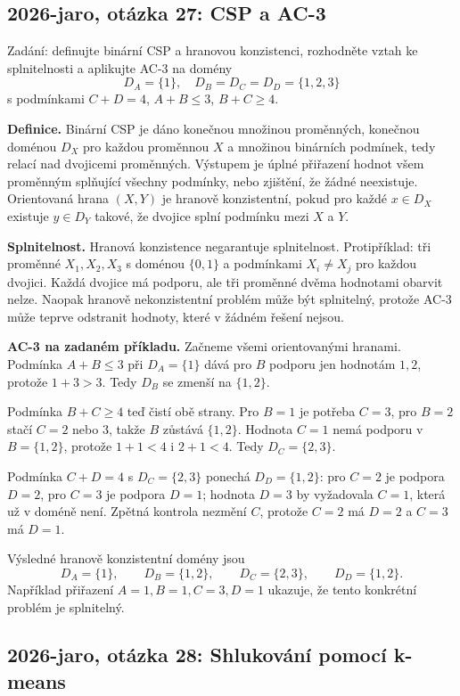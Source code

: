 \subsection{2026-jaro, otázka 27: CSP a AC-3}

Zadání: definujte binární CSP a hranovou konzistenci, rozhodněte vztah ke splnitelnosti a
aplikujte AC-3 na domény
\[
D_A=\{1\},\quad D_B=D_C=D_D=\{1,2,3\}
\]
s podmínkami $C+D=4$, $A+B\le 3$, $B+C\ge 4$.

\begin{odpoved}
\textbf{Definice.} Binární CSP je dáno konečnou množinou proměnných, konečnou doménou
$D_X$ pro každou proměnnou $X$ a množinou binárních podmínek, tedy relací nad dvojicemi
proměnných. Výstupem je úplné přiřazení hodnot všem proměnným splňující všechny podmínky,
nebo zjištění, že žádné neexistuje. Orientovaná hrana $(X,Y)$ je hranově konzistentní, pokud
pro každé $x\in D_X$ existuje $y\in D_Y$ takové, že dvojice splní podmínku mezi $X$ a $Y$.

\textbf{Splnitelnost.} Hranová konzistence negarantuje splnitelnost. Protipříklad: tři
proměnné $X_1,X_2,X_3$ s doménou $\{0,1\}$ a podmínkami $X_i\ne X_j$ pro každou dvojici.
Každá dvojice má podporu, ale tři proměnné dvěma hodnotami obarvit nelze. Naopak hranově
nekonzistentní problém může být splnitelný, protože AC-3 může teprve odstranit hodnoty,
které v žádném řešení nejsou.

\textbf{AC-3 na zadaném příkladu.} Začneme všemi orientovanými hranami. Podmínka
$A+B\le3$ při $D_A=\{1\}$ dává pro $B$ podporu jen hodnotám $1,2$, protože $1+3>3$.
Tedy $D_B$ se zmenší na $\{1,2\}$.

Podmínka $B+C\ge4$ teď čistí obě strany. Pro $B=1$ je potřeba $C=3$, pro $B=2$ stačí
$C=2$ nebo $3$, takže $B$ zůstává $\{1,2\}$. Hodnota $C=1$ nemá podporu v $B=\{1,2\}$,
protože $1+1<4$ i $2+1<4$. Tedy $D_C=\{2,3\}$.

Podmínka $C+D=4$ s $D_C=\{2,3\}$ ponechá $D_D=\{1,2\}$: pro $C=2$ je podpora $D=2$,
pro $C=3$ je podpora $D=1$; hodnota $D=3$ by vyžadovala $C=1$, která už v doméně není.
Zpětná kontrola nezmění $C$, protože $C=2$ má $D=2$ a $C=3$ má $D=1$.

Výsledné hranově konzistentní domény jsou
\[
D_A=\{1\},\qquad D_B=\{1,2\},\qquad D_C=\{2,3\},\qquad D_D=\{1,2\}.
\]
Například přiřazení $A=1,B=1,C=3,D=1$ ukazuje, že tento konkrétní problém je splnitelný.
\end{odpoved}

\subsection{2026-jaro, otázka 28: Shlukování pomocí k-means}

